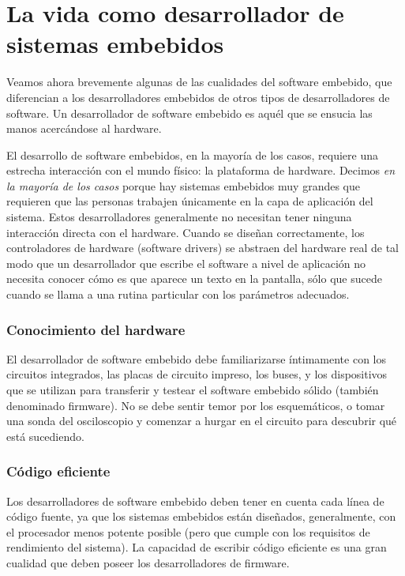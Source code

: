 \documentclass[output=paper, 
colorlinks,
citecolor=brown,
newtxmath
]{langscibook}
\begin{document}
\section {La vida como desarrollador de sistemas embebidos}

Veamos ahora brevemente algunas de las cualidades del software embebido, 
que diferencian a los desarrolladores embebidos de otros tipos de desarrolladores de software. 
Un desarrollador de software embebido es aquél que se ensucia las manos acercándose al hardware.

El desarrollo de software embebidos, en la mayoría de los casos, requiere una estrecha interacción 
con el mundo físico: la plataforma de hardware. Decimos \textit{en la mayoría de los casos}
porque hay sistemas embebidos muy grandes que requieren que las personas trabajen 
únicamente en la capa de aplicación del sistema. 
Estos desarrolladores generalmente no necesitan tener ninguna 
interacción directa con el hardware. Cuando se diseñan correctamente, los controladores 
de hardware (software drivers) se abstraen del hardware real de tal modo
que un desarrollador que escribe el software a nivel de aplicación 
no necesita conocer cómo es que aparece un texto en la pantalla, 
sólo que sucede cuando se llama a una rutina particular con los parámetros adecuados.


\subsubsection {Conocimiento del hardware}

El desarrollador de software embebido debe familiarizarse íntimamente con los 
circuitos integrados, las placas de circuito impreso, los buses, y los dispositivos 
que se utilizan para transferir y testear el software embebido sólido (también denominado firmware). 
No se debe sentir temor por los esquemáticos, o tomar una sonda del osciloscopio y 
comenzar a hurgar en el circuito para descubrir qué está sucediendo.



\subsubsection {Código eficiente}

Los desarrolladores de software embebido deben tener en cuenta
cada línea de código fuente, ya que los sistemas embebidos 
están diseñados, generalmente, con el procesador menos potente posible
(pero que cumple con los requisitos de rendimiento del sistema). 
La capacidad de escribir código eficiente es una gran cualidad
que deben poseer los desarrolladores de firmware.
\end{document}
